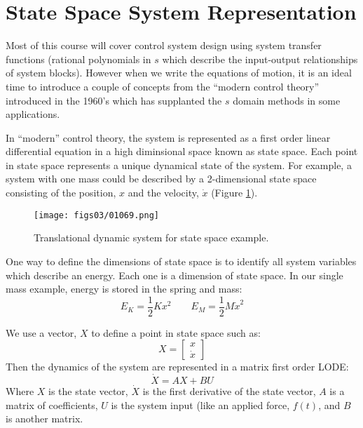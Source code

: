 \documentclass[letterpaper]{book}
\begin{document}
  

\section{State Space System Representation}
Most of this course will cover control system design using system transfer functions (rational polynomials in $s$ which describe the input-output relationships of system blocks).  However when we write the equations of motion, it is an ideal time to introduce a couple of concepts from the ``modern control theory'' introduced in the 1960's which has supplanted the $s$ domain methods in some applications.  

In ``modern'' control theory, the system is represented as a first order linear differential equation in a high diminsional space known as state space.  Each point in state space represents a unique dynamical state of the system.   For example, a system with one mass could be described by a 2-dimensional state space consisting of the position, $x$ and the velocity, $\dot{x}$ (Figure \ref{2Dstatespace}).

\begin{figure}\centering
\texttt{[image: figs03/01069.png]}
\caption{Translational dynamic system for state space example.}\label{2Dstatespace}
\end{figure}

One way to define the dimensions of state space is to identify all system variables which describe an energy.  Each one is a dimension of state space.   In our single mass example, energy is stored in the spring and mass:
\[
E_K = \frac{1}{2}Kx^2 \qquad E_M = \frac{1}{2}M{\dot{x}}^2
\]

We use a vector, $X$ to define a point in state space such as:
\[
X = \begin{bmatrix} x \\ \dot{x} \end{bmatrix}
\]
Then the dynamics of the system are represented in a matrix first order LODE:
\[
\dot{X} = AX+BU
\]
Where $X$ is the state vector, $\dot{X}$ is the first derivative of the state vector,
$A$ is a matrix of coefficients, $U$ is the system input (like an applied force, $f(t)$, and 
$B$ is another matrix. 
\end{document}
